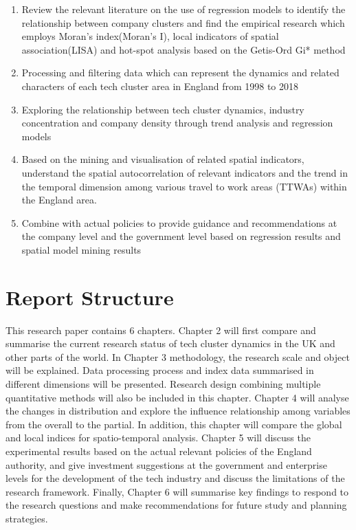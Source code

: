 \documentclass[
  12pt,
  oneside]{book}
\begin{document}
\begin{enumerate}
\def\labelenumi{\arabic{enumi}.}
\item
  Review the relevant literature on the use of regression models to identify the relationship between company clusters and find the empirical research which employs Moran's index(Moran's I), local indicators of spatial association(LISA) and hot-spot analysis based on the Getis-Ord Gi* method
\item
  Processing and filtering data which can represent the dynamics and related characters of each tech cluster area in England from 1998 to 2018
\item
  Exploring the relationship between tech cluster dynamics, industry concentration and company density through trend analysis and regression models
\item
  Based on the mining and visualisation of related spatial indicators, understand the spatial autocorrelation of relevant indicators and the trend in the temporal dimension among various travel to work areas (TTWAs) within the England area.
\item
  Combine with actual policies to provide guidance and recommendations at the company level and the government level based on regression results and spatial model mining results
\end{enumerate}

\hypertarget{report-structure}{%
\section{Report Structure}\label{report-structure}}

This research paper contains 6 chapters. Chapter 2 will first compare and summarise the current research status of tech cluster dynamics in the UK and other parts of the world. In Chapter 3 methodology, the research scale and object will be explained. Data processing process and index data summarised in different dimensions will be presented. Research design combining multiple quantitative methods will also be included in this chapter. Chapter 4 will analyse the changes in distribution and explore the influence relationship among variables from the overall to the partial. In addition, this chapter will compare the global and local indices for spatio-temporal analysis. Chapter 5 will discuss the experimental results based on the actual relevant policies of the England authority, and give investment suggestions at the government and enterprise levels for the development of the tech industry and discuss the limitations of the research framework. Finally, Chapter 6 will summarise key findings to respond to the research questions and make recommendations for future study and planning strategies.
\end{document}
